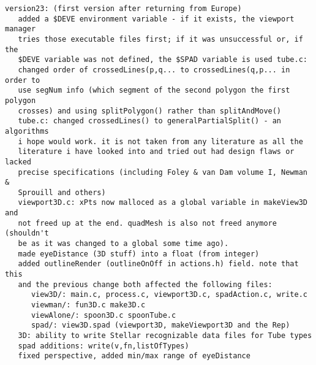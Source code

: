 \documentclass{article}
\begin{document}
\begin{verbatim}
version23: (first version after returning from Europe)
   added a $DEVE environment variable - if it exists, the viewport manager
   tries those executable files first; if it was unsuccessful or, if the
   $DEVE variable was not defined, the $SPAD variable is used tube.c:
   changed order of crossedLines(p,q... to crossedLines(q,p... in order to
   use segNum info (which segment of the second polygon the first polygon
   crosses) and using splitPolygon() rather than splitAndMove()
   tube.c: changed crossedLines() to generalPartialSplit() - an algorithms
   i hope would work. it is not taken from any literature as all the
   literature i have looked into and tried out had design flaws or lacked
   precise specifications (including Foley & van Dam volume I, Newman &
   Sprouill and others)
   viewport3D.c: xPts now malloced as a global variable in makeView3D and
   not freed up at the end. quadMesh is also not freed anymore (shouldn't
   be as it was changed to a global some time ago).
   made eyeDistance (3D stuff) into a float (from integer)
   added outlineRender (outlineOnOff in actions.h) field. note that this
   and the previous change both affected the following files:
      view3D/: main.c, process.c, viewport3D.c, spadAction.c, write.c
      viewman/: fun3D.c make3D.c
      viewAlone/: spoon3D.c spoonTube.c
      spad/: view3D.spad (viewport3D, makeViewport3D and the Rep)
   3D: ability to write Stellar recognizable data files for Tube types
   spad additions: write(v,fn,listOfTypes)
   fixed perspective, added min/max range of eyeDistance


\end{verbatim}
\end{document}
